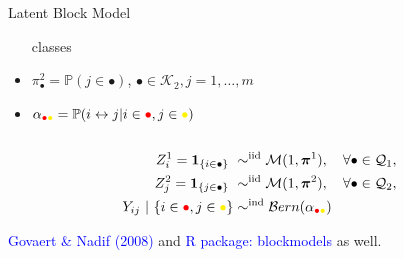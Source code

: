 \documentclass[compress,10pt]{beamer}
\newcommand{\bpi}{\boldsymbol{\pi}}
\def\bpi{\boldsymbol{\pi}}
\begin{document}
\begin{frame}
\begin{center}
\begin{overlayarea}{\textwidth}{.5\textheight}
\begin{columns}
\begin{column}{.5\paperwidth}
\begin{small}
\begin{block}{Latent Block Model}
\begin{itemize}
                classes
               \item  $\pi^2_\bullet  =  \mathbb{P}(j  \in  \bullet)$,
                $\bullet\in\mathcal{K}_2,j=1,\dots,m$
              \item      $\alpha_{\textcolor{red}{\bullet}\textcolor{yellow}{\bullet}}     =      \mathbb{P}(i
                \leftrightarrow j | i\in\textcolor{red}{\bullet},j\in\textcolor{yellow}{\bullet})$
              \end{itemize}
            \end{block}
          \end{small}
        \end{column}
      \end{columns}
    \end{overlayarea}
  \end{center}
  

\begin{align*}
Z^1_i = \mathbf{1}_{\{i \in \bullet\}}  \ & \sim^{\text{iid}} \mathcal{M}(1,\bpi^1), \quad \forall\bullet \in \mathcal{Q}_1, \\ 
Z^2_j=\mathbf{1}_{\{j \in \bullet\}}  \ & \sim^{\text{iid}} \mathcal{M}(1,\bpi^2), \quad \forall\bullet \in \mathcal{Q}_2, \\
Y_{ij} \ | \ \{i\in\textcolor{red}{\bullet},j\in\textcolor{yellow}{\bullet}\}
& \sim^{\text{ind}} \mathcal{B}ern(\alpha_{\textcolor{red}{\bullet}\textcolor{yellow}{\bullet}})\\
\end{align*}


\textcolor{blue}{Govaert \& Nadif (2008)} and 
\textcolor{blue}{R package: blockmodels} as well.

\end{frame}





\end{document}
